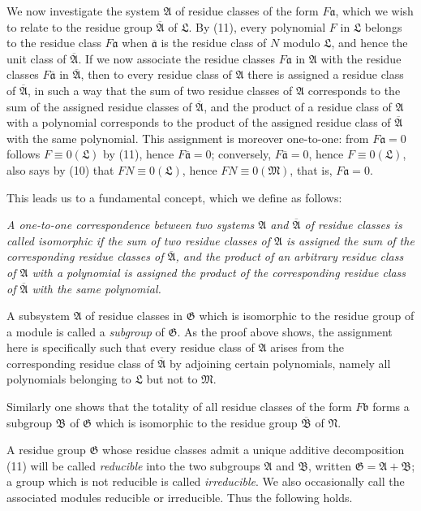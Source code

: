 \documentclass[11pt]{article}
\newcommand{\mM}{\mathfrak{M}}
\newcommand{\mN}{\mathfrak{N}}
\newcommand{\mL}{\mathfrak{L}}
\newcommand{\mG}{\mathfrak{G}}
\newcommand{\mA}{\mathfrak{A}}
\newcommand{\mB}{\mathfrak{B}}
\newcommand{\ma}{\mathfrak{a}}
\newcommand{\mb}{\mathfrak{b}}
\newcommand{\mbarA}{\overline{\mathfrak{A}}}
\newcommand{\mbarB}{\overline{\mathfrak{B}}}
\newcommand{\bara}{\overline{\mathfrak{a}}}
\begin{document}
We now investigate the system $\mA$ of residue classes of the form $F\ma$, which we wish to relate to the residue group $\mbarA$ of $\mL$. By (11), every polynomial $F$ in $\mL$ belongs to the residue class $F\ma$ when $\bara$ is the residue class of $N$ modulo $\mL$, and hence the unit class of $\mbarA$. If we now associate the residue classes $F\ma$ in $\mA$ with the residue classes $F\bara$ in $\mbarA$, then to every residue class of $\mA$ there is assigned a residue class of $\mbarA$, in such a way that the sum of two residue classes of $\mA$ corresponds to the sum of the assigned residue classes of $\mbarA$, and the product of a residue class of $\mA$ with a polynomial corresponds to the product of the assigned residue class of $\mbarA$ with the same polynomial. This assignment is moreover one-to-one: from $F\ma=0$ follows $F\equiv0(\mL)$ by (11), hence $F\bara=0$; conversely, $F\bara=0$, hence $F\equiv0(\mL)$, also says by (10) that $FN\equiv0(\mL)$, hence $FN\equiv0(\mM)$, that is, $F\ma=0$.

This leads us to a fundamental concept, which we define as follows:

\emph{A one-to-one correspondence between two systems $\mA$ and $\mbarA$ of residue classes is called isomorphic if the sum of two residue classes of $\mA$ is assigned the sum of the corresponding residue classes of $\mbarA$, and the product of an arbitrary residue class of $\mA$ with a polynomial is assigned the product of the corresponding residue class of $\mbarA$ with the same polynomial.}

A subsystem $\mA$ of residue classes in $\mG$ which is isomorphic to the residue group of a module is called a \emph{subgroup} of $\mG$. As the proof above shows, the assignment here is specifically such that every residue class of $\mA$ arises from the corresponding residue class of $\mbarA$ by adjoining certain polynomials, namely all polynomials belonging to $\mL$ but not to $\mM$.

Similarly one shows that the totality of all residue classes of the form $F\mb$ forms a subgroup $\mB$ of $\mG$ which is isomorphic to the residue group $\mbarB$ of $\mN$.

A residue group $\mG$ whose residue classes admit a unique additive decomposition (11) will be called \emph{reducible} into the two subgroups $\mA$ and $\mB$, written $\mG=\mA+\mB$; a group which is not reducible is called \emph{irreducible}. We also occasionally call the associated modules reducible or irreducible. Thus the following holds.
\end{document}
